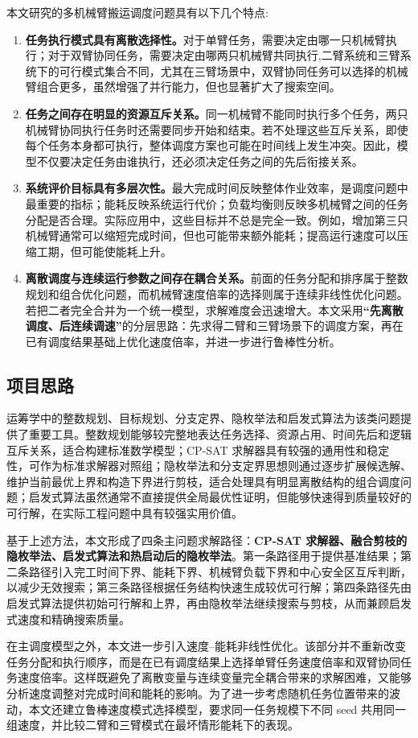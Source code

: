 本文研究的多机械臂搬运调度问题具有以下几个特点:
\begin{enumerate}
	\item \textbf{任务执行模式具有离散选择性。}对于单臂任务，需要决定由哪一只机械臂执行；对于双臂协同任务，需要决定由哪两只机械臂共同执行,二臂系统和三臂系统下的可行模式集合不同，尤其在三臂场景中，双臂协同任务可以选择的机械臂组合更多，虽然增强了并行能力，但也显著扩大了搜索空间。
\item \textbf{任务之间存在明显的资源互斥关系。}同一机械臂不能同时执行多个任务，两只机械臂协同执行任务时还需要同步开始和结束。若不处理这些互斥关系，即使每个任务本身都可执行，整体调度方案也可能在时间线上发生冲突。因此，模型不仅要决定任务由谁执行，还必须决定任务之间的先后衔接关系。

\item \textbf{系统评价目标具有多层次性。}最大完成时间反映整体作业效率，是调度问题中最重要的指标；能耗反映系统运行代价；负载均衡则反映多机械臂之间的任务分配是否合理。实际应用中，这些目标并不总是完全一致。例如，增加第三只机械臂通常可以缩短完成时间，但也可能带来额外能耗；提高运行速度可以压缩工期，但可能使能耗上升。

\item \textbf{离散调度与连续运行参数之间存在耦合关系。}前面的任务分配和排序属于整数规划和组合优化问题，而机械臂速度倍率的选择则属于连续非线性优化问题。若把二者完全合并为一个统一模型，求解难度会迅速增大。本文采用\textbf{“先离散调度、后连续调速”}的分层思路：先求得二臂和三臂场景下的调度方案，再在已有调度结果基础上优化速度倍率，并进一步进行鲁棒性分析。

\end{enumerate}

\subsection{项目思路}

运筹学中的整数规划、目标规划、分支定界、隐枚举法和启发式算法为该类问题提供了重要工具。整数规划能够较完整地表达任务选择、资源占用、时间先后和逻辑互斥关系，适合构建标准数学模型；CP-SAT 求解器具有较强的通用性和稳定性，可作为标准求解器对照组；隐枚举法和分支定界思想则通过逐步扩展候选解、维护当前最优上界和构造下界进行剪枝，适合处理具有明显离散结构的组合调度问题；启发式算法虽然通常不直接提供全局最优性证明，但能够快速得到质量较好的可行解，在实际工程问题中具有较强实用价值。

基于上述方法，本文形成了四条主问题求解路径：\textbf{CP-SAT 求解器、融合剪枝的隐枚举法、启发式算法和热启动后的隐枚举法}。第一条路径用于提供基准结果；第二条路径引入完工时间下界、能耗下界、机械臂负载下界和中心安全区互斥判断，以减少无效搜索；第三条路径根据任务结构快速生成较优可行解；第四条路径先由启发式算法提供初始可行解和上界，再由隐枚举法继续搜索与剪枝，从而兼顾启发式速度和精确搜索质量。

在主调度模型之外，本文进一步引入速度--能耗非线性优化。该部分并不重新改变任务分配和执行顺序，而是在已有调度结果上选择单臂任务速度倍率和双臂协同任务速度倍率。这样既避免了离散变量与连续变量完全耦合带来的求解困难，又能够分析速度调整对完成时间和能耗的影响。为了进一步考虑随机任务位置带来的波动，本文还建立鲁棒速度模式选择模型，要求同一任务规模下不同 seed 共用同一组速度，并比较二臂和三臂模式在最坏情形能耗下的表现。
